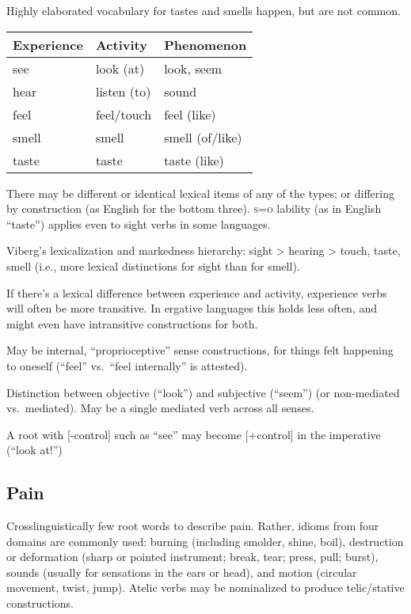 \documentclass[11pt]{article}
\newcommand{\I}[1]{\textsc{#1}}   %
\begin{document}
Highly elaborated vocabulary for tastes and smells happen, but are not
common. 

\begin{center}
  \begin{tabular}{lll}
    Experience & Activity & Phenomenon \\
    \hline
    see & look (at) & look, seem \\
    hear & listen (to) & sound \\
    feel & feel/touch & feel (like) \\
    smell & smell & smell (of/like) \\
    taste & taste & taste (like)
  \end{tabular}
\end{center}

There may be different or identical lexical items of any of the types;
or differing by construction (as English for the bottom
three).  \I{s=o} lability (as in English ``taste'') applies even to
sight verbs in some languages.

Viberg's lexicalization and markedness hierarchy: sight > hearing >
touch, taste, smell (i.e., more lexical distinctions for sight than
for smell).

If there's a lexical difference between experience and activity,
experience verbs will often be more transitive.  In ergative
languages this holds less often, and might even have intransitive
constructions for both.

May be internal, ``proprioceptive'' sense constructions, for things
felt happening to oneself (``feel'' vs.\ ``feel internally'' is
attested). 

Distinction between objective (``look'') and subjective (``seem'') (or
non-mediated vs.\ mediated).  May be a single mediated verb across all
senses.

A root with [-control] such as ``see'' may become [+control] in the
imperative (``look at!'')


\subsection{Pain}
Crosslinguistically few root words to describe pain.  Rather, idioms
from four domains are commonly used: burning (including smolder,
shine, boil), destruction or deformation (sharp or pointed instrument;
break, tear; press, pull; burst), sounds (usually for sensations in
the ears or head), and motion (circular movement, twist, jump).
Atelic verbs may be nominalized to produce telic/stative
constructions.
\end{document}
